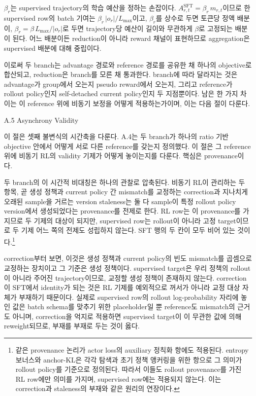 $\beta_r$는 supervised trajectory의 학습 예산을 정하는 손잡이다. $A^{\mathrm{SFT}}_{r,t} = \beta_r\, m_{r,t}$이므로 한 supervised row의 batch 기여는 $\beta_r\,\lvert o_r \rvert / L_{\max}$이고, $\beta_r$를 상수로 두면 토큰당 정액 배분이, $\beta_r = \beta\, L_{\max} / \lvert o_r \rvert$로 두면 trajectory당 예산이 길이와 무관하게 $\beta$로 고정되는 배분이 된다. 어느 배분이든 reduction이 아니라 reward 채널이 표현하므로 aggregation은 supervised 배분에 대해 중립이다.

이로써 두 branch는 advantage 경로와 reference 경로를 공유한 채 하나의 objective로 합산되고, reduction은 branch를 모른 채 통과한다. branch에 따라 달라지는 것은 advantage가 group에서 오는지 pseudo reward에서 오는지, 그리고 reference가 rollout policy인지 self-detached current policy인지 두 지점뿐이다. 남은 한 가지 차이는 이 reference 위에 비동기 보정을 어떻게 적용하는가이며, 이는 다음 절이 다룬다.




A.5 Asynchrony Validity

이 절은 셋째 불변식의 시간축을 다룬다. A.4는 두 branch가 하나의 ratio 기반 objective 안에서 어떻게 서로 다른 reference를 갖는지 정의했다. 이 절은 그 reference 위에 비동기 RL의 validity 기제가 어떻게 놓이는지를 다룬다. 핵심은 provenance이다.

두 branch의 이 시간적 비대칭은 하나의 관찰로 압축된다. 비동기 RL이 관리하는 두 항목, 곧 생성 정책과 current policy 간 mismatch를 교정하는 correction과 지나치게 오래된 sample을 거르는 version staleness는 둘 다 sample이 특정 rollout policy version에서 생성되었다는 provenance를 전제로 한다. RL row는 이 provenance를 가지므로 두 기제의 대상이 되지만, supervised row는 rollout이 아니라 고정 target이므로 두 기제 어느 쪽의 전제도 성립하지 않는다. SFT 행의 두 칸이 모두 비어 있는 것이다.\footnote{같은 provenance 논리가 actor loss의 auxiliary 정칙화 항에도 적용된다. entropy 보너스와 anchor-KL은 각각 탐색과 초기 정책 앵커링을 위한 항으로 그 의미가 rollout policy를 기준으로 정의된다. 따라서 이들도 rollout provenance를 가진 RL row에만 의미를 가지며, supervised row에는 적용되지 않는다. 이는 correction과 staleness의 부재와 같은 원리의 연장이다.}

correction부터 보면, 이것은 생성 정책과 current policy의 빈도 mismatch를 곱셈으로 교정하는 장치이고 그 기준은 생성 정책이다. supervised target은 우리 정책의 rollout이 아니라 주어진 trajectory이므로, 교정할 생성 정책이 존재하지 않는다. correction이 SFT에서 identity가 되는 것은 RL 기제를 예외적으로 꺼서가 아니라 교정 대상 자체가 부재하기 때문이다. 실제로 supervised row의 rollout log-probability 자리에 놓인 값은 batch schema를 맞추기 위한 placeholder일 뿐 reference도 mismatch의 근거도 아니며, correction을 억지로 적용하면 supervised target이 이 무관한 값에 의해 reweight되므로, 부재를 부재로 두는 것이 옳다.

